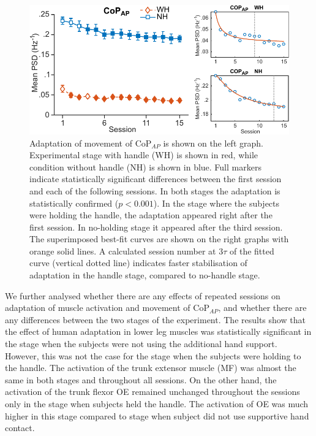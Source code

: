 \documentclass[final,5p,twocolumn]{elsarticle}
\begin{document}
\begin{figure}
	\begin{center}
		\includegraphics[width=\linewidth]{images/COPapAndTau.pdf}
		\caption{Adaptation of movement of CoP$_{AP}$ is shown on the left graph. Experimental stage with handle (WH) is shown in red, while condition without handle (NH) is shown in blue. Full markers indicate statistically significant differences between the first session and each of the following sessions. In both stages the adaptation is statistically confirmed ($p < 0.001$). In the stage where the subjects were holding the handle, the adaptation appeared right after the first session. In no-holding stage it appeared after the third session. The superimposed best-fit curves are shown on the right graphs with orange solid lines. A calculated session number at 3$\tau$ of the fitted curve (vertical dotted line) indicates faster stabilisation of adaptation in the handle stage, compared to no-handle stage.}
		\label{fig:COPapAndTau}
	\end{center}
\end{figure}


We further analysed whether there are any effects of repeated sessions on adaptation of muscle activation and movement of CoP$_{AP}$, and whether there are any differences between the two stages of the experiment. The results show that the effect of human adaptation in lower leg muscles was statistically significant in the stage when the subjects were not using the additional hand support. However, this was not the case for the stage when the subjects were holding to the handle. The activation of the trunk extensor muscle (MF) was almost the same in both stages and throughout all sessions. On the other hand, the activation of the trunk flexor OE remained unchanged throughout the sessions only in the stage when subjects held the handle. The activation of OE was much higher in this stage compared to stage when subject did not use supportive hand contact.
\end{document}
